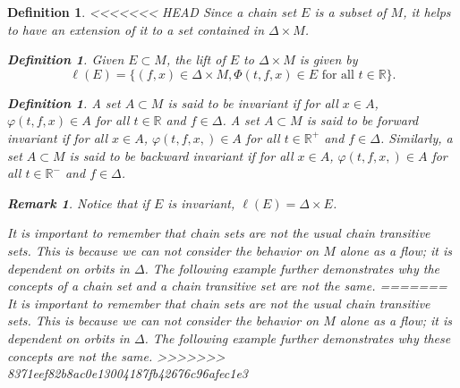 \documentclass[11pt]{article}
\newtheorem{defn}[thm]{Definition}
\newtheorem{remark}[thm]{Remark}
\begin{document}
\begin{defn}
<<<<<<< HEAD
\indent Since a chain set $E$ is a subset of $M$, it helps to have an extension of it to a set contained in $\Delta\times M$. 

\begin{defn}
Given $E\subset M$, the lift of $E$ to $\Delta\times M$ is given by
$$\ell(E)=\{(f,x)\in \Delta\times M,\Phi(t,f,x)\in E \text{ for all }t\in\mathbb{R}\}.$$
\end{defn}

\begin{defn}
A set $A\subset M$ is said to be invariant if for all $x\in A$, $\varphi(t,f,x)\in A$ for all $t\in\mathbb{R}$ and $f\in\Delta$.
A set $A\subset M$ is said to be forward invariant if for all $x\in A$, $\varphi(t,f,x,)\in A$ for all $t\in \mathbb{R}^+$ and $f\in\Delta$.  Similarly, a set $A\subset M$ is said to be backward invariant if for all $x\in A$, $\varphi(t,f,x,)\in A$ for all $t\in \mathbb{R}^-$ and $f\in\Delta$.
\end{defn}


\begin{remark}
Notice that if $E$ is invariant, $\ell(E)=\Delta\times E$. 
\end{remark}

\indent It is important to remember that chain sets are not the usual chain transitive sets. This is because we can not consider the behavior on $M$ alone as a flow; it is dependent on orbits in $\Delta$. The following example further demonstrates why the concepts of a chain set and a chain transitive set are not the same.
=======
\indent It is important to remember that chain sets are not the usual chain transitive sets.
This is because we can not consider the behavior on $M$ alone as a flow; it is dependent on orbits in $\Delta$. The following example further demonstrates why these concepts are not the same.
>>>>>>> 8371eef82b8ac0e13004187fb42676c96afec1e3


\end{defn}
\end{document}
